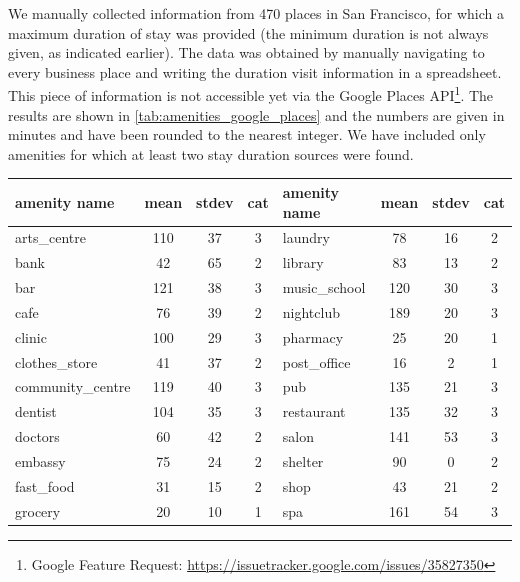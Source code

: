 We manually collected information from 470 places in San Francisco, for which a maximum duration of stay was provided (the minimum duration is not always given, as indicated earlier).
The data was obtained by manually navigating to every business place and writing the duration visit information in a spreadsheet.
This piece of information is not accessible yet via the Google Places API\footnote{Google Feature Request: \url{https://issuetracker.google.com/issues/35827350}}.
The results are shown in \cref{tab:amenities_google_places} and the numbers are given in minutes and have been rounded to the nearest integer. We have included only amenities for which at least two stay duration sources were found. 

\begin{table}[!ht]
	{\begin{tabular}{ | l | c | c | c || l | c | c | c |}
		\hline		
		\textbf{amenity name} & \textbf{mean} & \textbf{stdev} & \textbf{cat} & \textbf{amenity name} & \textbf{mean} & \textbf{stdev} & \textbf{cat} \\ \hline
		arts\_centre  & 110 & 37 & 3 & laundry  & 78 & 16 & 2 \\ \hline
		bank  & 42 & 65 & 2 &  library  & 83 & 13 & 2 \\ \hline
		bar  & 121 & 38 & 3 &  music\_school  & 120 & 30 & 3 \\ \hline
		cafe  & 76 & 39 & 2 &  nightclub  & 189 & 20 & 3 \\ \hline
		clinic  & 100 & 29 & 3 &  pharmacy  & 25 & 20 & 1 \\ \hline
		clothes\_store  & 41 & 37 & 2 &  post\_office  & 16 & 2 & 1 \\ \hline
		community\_centre  & 119 & 40 & 3 &  pub  & 135 & 21 & 3 \\ \hline
		dentist  & 104 & 35 & 3 &  restaurant  & 135 & 32 & 3 \\ \hline
		doctors  & 60 & 42 & 2 &  salon  & 141 & 53 & 3 \\ \hline
		embassy  & 75 & 24 & 2 &  shelter  & 90 & 0 & 2 \\ \hline
		fast\_food  & 31 & 15 & 2 &  shop  & 43 & 21 & 2 \\ \hline
		grocery  & 20 & 10 & 1 &  spa  & 161 & 54 & 3 \\ \hline

\end{tabular}}
\end{table}
